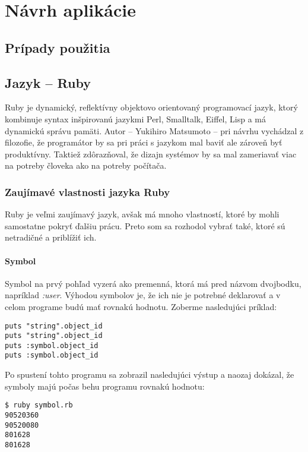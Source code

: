 \chapter{Návrh aplikácie}

\section{Prípady použitia}

\section{Jazyk -- Ruby}

Ruby je dynamický, reflektívny objektovo orientovaný programovací jazyk, ktorý kombinuje syntax inšpirovanú jazykmi Perl, Smalltalk, Eiffel, Lisp a má dynamickú správu pamäti. Autor -- Yukihiro Matsumoto -- pri návrhu vychádzal z filozofie, že programátor by sa pri práci s jazykom mal baviť ale zároveň byť produktívny. Taktiež zdôrazňoval, že dizajn systémov by sa mal zameriavať viac na potreby človeka ako na potreby počítača. \citep{matsumoto2002ruby}

\subsection{Zaujímavé vlastnosti jazyka Ruby}

Ruby je veľmi zaujímavý jazyk, avšak má mnoho vlastností, ktoré by mohli samostatne pokryť ďalšiu prácu. Preto som sa rozhodol vybrať také, ktoré sú netradičné a priblížiť ich.

\subsubsection{Symbol}

Symbol na prvý pohľad vyzerá ako premenná, ktorá má pred názvom dvojbodku, napríklad \emph{:user}. Výhodou symbolov je, že ich nie je potrebné deklarovať a v celom programe budú mať rovnakú hodnotu. Zoberme nasledujúci príklad:

\begin{verbatim}
puts "string".object_id
puts "string".object_id
puts :symbol.object_id
puts :symbol.object_id
\end{verbatim}

Po spustení tohto programu sa zobrazil nasledujúci výstup a naozaj dokázal, že symboly majú počas behu programu rovnakú hodnotu:

\begin{verbatim}
$ ruby symbol.rb
90520360
90520080
801628
801628
\end{verbatim}

